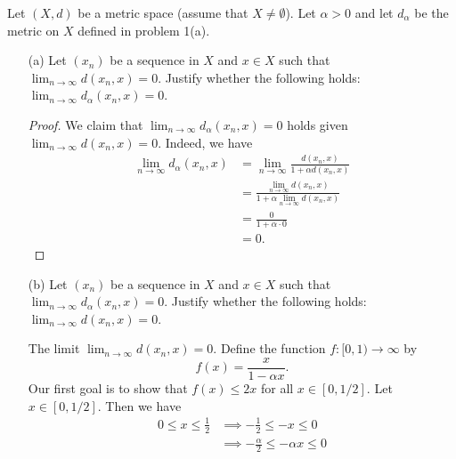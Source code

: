 \documentclass[a4paper]{article}
\begin{document}
\begin{problem}
    Let \( (X,d) \) be a metric space (assume that \( X \neq \emptyset \)). Let \( \alpha > 0  \) and let \( {d}_{\alpha} \) be the metric on \( X  \) defined in problem 1(a).
\end{problem}

\begin{enumerate}
    \item[(a)] Let \( ({x}_{n}) \) be a sequence in \( X  \) and \( x \in X  \) such that \( \lim_{ n \to \infty  }  d({x}_{n},x) = 0  \). Justify whether the following holds: \( \lim_{ n \to \infty  }  {d}_{\alpha}({x}_{n}, x) = 0  \).
        \begin{proof}
            We claim that \( \lim_{ n \to \infty  }  {d}_{\alpha}({x}_{n}, x) = 0 \) holds given \( \lim_{ n \to \infty  }  d({x}_{n}, x) = 0  \). Indeed, we have
            \begin{align*}
                \lim_{ n \to \infty  }  {d}_{\alpha}({x}_{n}, x) &= \lim_{ n \to \infty  }  \frac{ d({x}_{n}, x) }{  1 + \alpha d({x}_{n}, x) }  \\
                                                                 &= \frac{ \lim_{ n \to \infty  } d({x}_{n}, x) }{  1 + \alpha \lim_{ n \to \infty  } d({x}_{n},x) }  \\
                                                                 &= \frac{  0  }{  1 + \alpha \cdot  0 }  \\
                                                                 &= 0.
            \end{align*}
        \end{proof}
    \item[(b)] Let \( (x_{n}) \) be a sequence in \( X  \) and \( x \in X  \) such that \( \lim_{ n \to \infty  }  d_{\alpha}({x}_{n}, x) = 0  \). Justify whether the following holds: \( \lim_{ n  \to  \infty   }  d({x}_{n}, x)  = 0  \).
        \begin{solution}
            The limit \( \lim_{ n \to \infty  }  d({x}_{n}, x) = 0  \). Define the function \( f: [0,1) \to \infty   \) by
            \[  f(x) = \frac{ x  }{  1- \alpha x }.  \]
            Our first goal is to show that \( f(x) \leq 2x  \) for all \( x \in [0,1/2] \). Let \( x \in [0,1/2] \). Then we have 
            \begin{align*}
                0 \leq x \leq \frac{ 1 }{ 2 } &\implies  - \frac{ 1}{ 2 }  \leq - x \leq 0  \\
                                              &\implies - \frac{ \alpha }{ 2 } \leq - \alpha x \leq 0 \\  

\end{align*}
\end{solution}
\end{enumerate}
\end{document}
